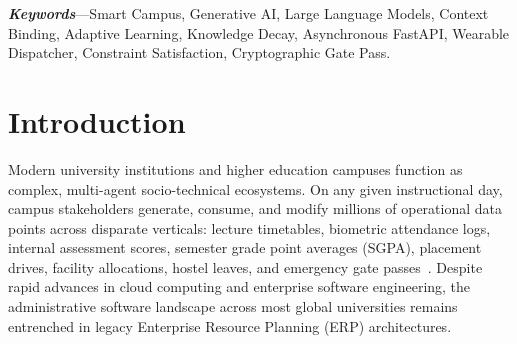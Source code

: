 \documentclass[11pt,a4paper]{article}
\begin{document}
\textbf{\textit{Keywords}}---Smart Campus, Generative AI, Large Language Models, Context Binding, Adaptive Learning, Knowledge Decay, Asynchronous FastAPI, Wearable Dispatcher, Constraint Satisfaction, Cryptographic Gate Pass.

\newpage
\tableofcontents
\newpage

\section{Introduction}
\label{sec:intro}

Modern university institutions and higher education campuses function as complex, multi-agent socio-technical ecosystems. On any given instructional day, campus stakeholders generate, consume, and modify millions of operational data points across disparate verticals: lecture timetables, biometric attendance logs, internal assessment scores, semester grade point averages (SGPA), placement drives, facility allocations, hostel leaves, and emergency gate passes~\cite{anand2024systematic}. Despite rapid advances in cloud computing and enterprise software engineering, the administrative software landscape across most global universities remains entrenched in legacy Enterprise Resource Planning (ERP) architectures.
\end{document}
